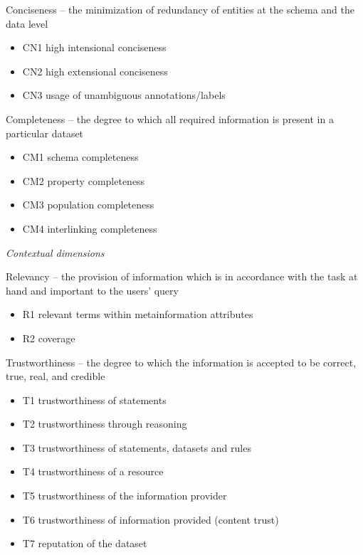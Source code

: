Conciseness -- the minimization of redundancy of entities at the schema and the data level
\begin{itemize}
 \setlength{\parskip}{0pt}
 \setlength{\itemsep}{0pt plus 1pt}
 \item CN1 high intensional conciseness
 \item CN2 high extensional conciseness
 \item CN3 usage of unambiguous annotations/labels
\end{itemize}

Completeness -- the degree to which all required information is present in a particular dataset
\begin{itemize}
 \setlength{\parskip}{0pt}
 \setlength{\itemsep}{0pt plus 1pt}
 \item CM1 schema completeness
 \item CM2 property completeness
 \item CM3 population completeness
 \item CM4 interlinking completeness
\end{itemize}

\emph{Contextual dimensions}

Relevancy -- the provision of information which is in accordance with the task at hand and important to the users’ query
\begin{itemize}
 \setlength{\parskip}{0pt}
 \setlength{\itemsep}{0pt plus 1pt}
 \item R1 relevant terms within metainformation attributes
 \item R2 coverage
\end{itemize}

Trustworthiness -- the degree to which the information is accepted to be correct, true, real, and credible
\begin{itemize}
 \setlength{\parskip}{0pt}
 \setlength{\itemsep}{0pt plus 1pt}
 \item T1 trustworthiness of statements
 \item T2 trustworthiness through reasoning
 \item T3 trustworthiness of statements, datasets and rules
 \item T4 trustworthiness of a resource
 \item T5 trustworthiness of the information provider
 \item T6 trustworthiness of information provided (content trust)
 \item T7 reputation of the dataset
\end{itemize}


